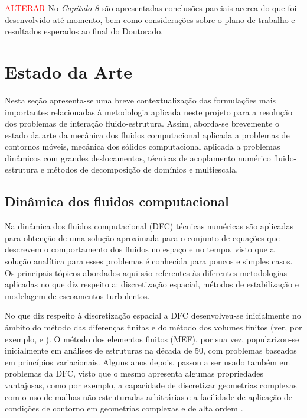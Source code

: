 \documentclass[tese_patricia.tex]{subfiles}
\begin{document}
\textcolor{red}{ALTERAR} No \textit{Capítulo 8} são apresentadas conclusões parciais acerca do que foi desenvolvido até momento, bem como considerações sobre o plano de trabalho e resultados esperados ao final do Doutorado.


\section[Estado da Arte]{Estado da Arte}\label{section:estado_da_arte}

Nesta seção apresenta-se uma breve contextualização das formulações mais importantes relacionadas à metodologia aplicada neste projeto para a resolução dos problemas de interação fluido-estrutura. Assim, aborda-se brevemente o estado da arte da mecânica dos fluidos computacional aplicada a problemas de contornos móveis, mecânica dos sólidos computacional aplicada a problemas dinâmicos com grandes deslocamentos, técnicas de acoplamento numérico fluido-estrutura e métodos de decomposição de domínios e multiescala.

\subsection{Dinâmica dos fluidos computacional}
\label{cfdsection}

Na dinâmica dos fluidos computacional (DFC) técnicas numéricas são aplicadas para obtenção de uma solução aproximada para o conjunto de equações que descrevem o comportamento dos fluidos no espaço e no tempo, visto que a solução analítica para esses problemas é conhecida para poucos e simples casos. Os principais tópicos abordados aqui são referentes às diferentes metodologias aplicadas no que  diz respeito a: discretização espacial, métodos de estabilização e modelagem de escoamentos turbulentos. 

No que diz respeito à discretização espacial a DFC desenvolveu-se inicialmente no âmbito do método das diferenças finitas e do método dos volumes finitos (ver, por exemplo,  e ). O método dos elementos finitos (MEF), por sua vez, popularizou-se inicialmente em análises de estruturas na década de 50, com problemas baseados em princípios variacionais. Alguns anos depois, passou a ser usado também em problemas da DFC, visto que o mesmo apresenta algumas propriedades vantajosas, como por exemplo, a capacidade de discretizar geometrias complexas com o uso de malhas não estruturadas arbitrárias e a facilidade de aplicação de condições de contorno em geometrias complexas e de alta ordem \cite{ZienkiewiczTN:2005,ReddyG:2000}.
\end{document}
